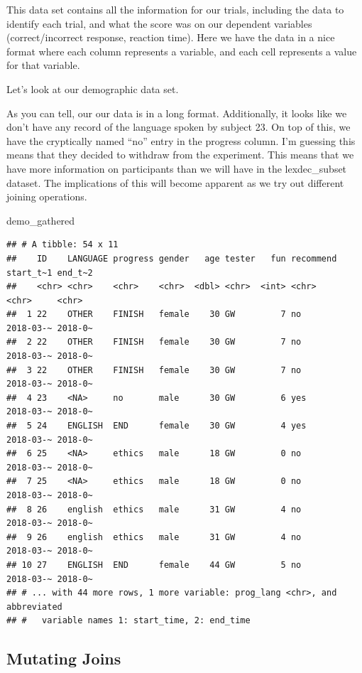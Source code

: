 \documentclass[
]{book}
\newenvironment{Shaded}{\begin{snugshade}}{\end{snugshade}}
\newcommand{\NormalTok}[1]{#1}
\begin{document}
This data set contains all the information for our trials, including the data to identify each trial, and what the score was on our dependent variables (correct/incorrect response, reaction time). Here we have the data in a nice format where each column represents a variable, and each cell represents a value for that variable.

Let's look at our demographic data set.

As you can tell, our our data is in a long format. Additionally, it looks like we don't have any record of the language spoken by subject 23. On top of this, we have the cryptically named ``no'' entry in the progress column. I'm guessing this means that they decided to withdraw from the experiment. This means that we have more information on participants than we will have in the lexdec\_subset dataset. The implications of this will become apparent as we try out different joining operations.

\begin{Shaded}
\begin{Highlighting}[]
\NormalTok{demo\_gathered}
\end{Highlighting}
\end{Shaded}

\begin{verbatim}
## # A tibble: 54 x 11
##    ID    LANGUAGE progress gender   age tester   fun recommend start_t~1 end_t~2
##    <chr> <chr>    <chr>    <chr>  <dbl> <chr>  <int> <chr>     <chr>     <chr>  
##  1 22    OTHER    FINISH   female    30 GW         7 no        2018-03-~ 2018-0~
##  2 22    OTHER    FINISH   female    30 GW         7 no        2018-03-~ 2018-0~
##  3 22    OTHER    FINISH   female    30 GW         7 no        2018-03-~ 2018-0~
##  4 23    <NA>     no       male      30 GW         6 yes       2018-03-~ 2018-0~
##  5 24    ENGLISH  END      female    30 GW         4 yes       2018-03-~ 2018-0~
##  6 25    <NA>     ethics   male      18 GW         0 no        2018-03-~ 2018-0~
##  7 25    <NA>     ethics   male      18 GW         0 no        2018-03-~ 2018-0~
##  8 26    english  ethics   male      31 GW         4 no        2018-03-~ 2018-0~
##  9 26    english  ethics   male      31 GW         4 no        2018-03-~ 2018-0~
## 10 27    ENGLISH  END      female    44 GW         5 no        2018-03-~ 2018-0~
## # ... with 44 more rows, 1 more variable: prog_lang <chr>, and abbreviated
## #   variable names 1: start_time, 2: end_time
\end{verbatim}

\hypertarget{mutating-joins}{%
\subsection{Mutating Joins}\label{mutating-joins}}
\end{document}
